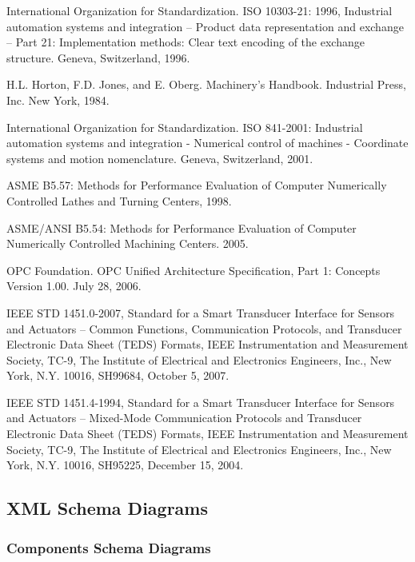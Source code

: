 International Organization for Standardization. ISO 10303-21: 1996, Industrial automation systems and integration -- Product data representation and exchange -- Part 21: Implementation methods: Clear text encoding of the exchange structure. Geneva, Switzerland, 1996.

H.L. Horton, F.D. Jones, and E. Oberg. Machinery's Handbook. Industrial Press, Inc. New York, 1984.

International Organization for Standardization. ISO 841-2001: Industrial automation systems and integration - Numerical control of machines - Coordinate systems and motion nomenclature. Geneva, Switzerland, 2001.

ASME B5.57: Methods for Performance Evaluation of Computer Numerically Controlled Lathes and Turning Centers, 1998.

ASME/ANSI B5.54: Methods for Performance Evaluation of Computer Numerically Controlled Machining Centers. 2005.

OPC Foundation. OPC Unified Architecture Specification, Part 1: Concepts Version 1.00. July 28, 2006.

IEEE STD 1451.0-2007, Standard for a Smart Transducer Interface for Sensors and Actuators – Common Functions, Communication Protocols, and Transducer Electronic Data Sheet (TEDS) Formats, IEEE Instrumentation and Measurement Society, TC-9, The Institute of Electrical and Electronics Engineers, Inc., New York, N.Y. 10016, SH99684, October 5, 2007.

IEEE STD 1451.4-1994, Standard for a Smart Transducer Interface for Sensors and Actuators – Mixed-Mode Communication Protocols and Transducer Electronic Data Sheet (TEDS) Formats, IEEE Instrumentation and Measurement Society, TC-9, The Institute of Electrical and Electronics Engineers, Inc., New York, N.Y. 10016, SH95225, December 15, 2004. \newpage 

\subsection{XML Schema Diagrams}
\label{sec:XML Schema Diagrams}

\subsubsection{Components Schema Diagrams}
\label{sec:Components Schema Diagrams}

